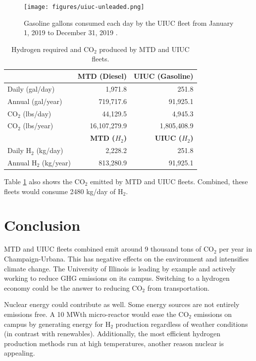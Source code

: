 \documentclass{anstrans}
\begin{document}
\begin{figure}[H]
	\centering
	\texttt{[image: figures/uiuc-unleaded.png]}
	\hfill
	\caption{Gasoline gallons consumed each day by the \gls{UIUC} fleet from January 1, 2019 to December 31, 2019 \cite{uiuc_personnal_communication}.}
	\label{fig:uiucfuel}
\end{figure}

\begin{table}[H]
	\centering
    \caption{Hydrogen required and CO$_2$ produced by \gls{MTD} and \gls{UIUC} fleets.}
    \label{tab:h2req}
\begin{tabular}{l|rr}
\hline
                   & \textbf{MTD (Diesel)}   & \textbf{UIUC (Gasoline)}  \\ \hline
                   Daily (gal/day)    & 1,971.8        & 251.8            \\
                   Annual (gal/year)    & 719,717.6      & 91,925.1         \\
                CO$_2$ (lbs/day)   & 44,129.5       & 4,945.3          \\
                CO$_2$ (lbs/year)  & 16,107,279.9   & 1,805,408.9      \\ \hline
                   & \textbf{MTD ($H_2$)}   & \textbf{UIUC ($H_2$)}  \\ \hline
                Daily H$_2$ (kg/day)    & 2,228.2        & 251.8            \\
                Annual H$_2$ (kg/year)   & 813,280.9      & 91,925.1         \\\hline
\end{tabular}
\end{table}

Table \ref{tab:h2req} also shows the CO$_2$ emitted by \gls{MTD} and UIUC fleets.
Combined, these fleets would consume 2480 kg/day of H$_2$.

\section{Conclusion}

\gls{MTD} and \gls{UIUC} fleets combined emit around 9 thousand tons of CO$_2$ per year in Champaign-Urbana. This has negative effects on the environment and intensifies climate change. The University of Illinois is leading by example and actively working to reduce \gls{GHG} emissions on its campus. Switching to a hydrogen economy could be the answer to reducing CO$_2$ from transportation.

Nuclear energy could contribute as well. Some energy sources are not entirely emissions free. A 10 MWth micro-reactor would ease the CO$_2$ emissions on campus by generating energy for H$_2$ production regardless of weather conditions (in contrast with renewables). Additionally, the most efficient hydrogen production methods run at high temperatures, another reason nuclear is appealing.
\end{document}
